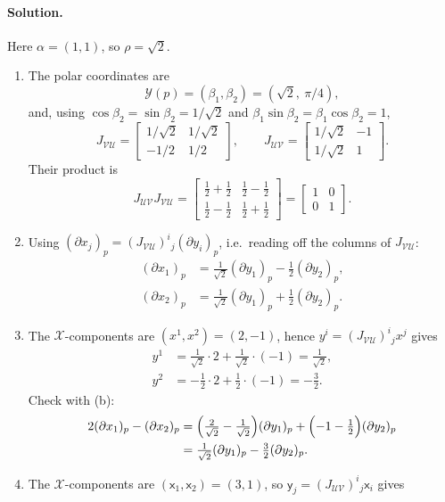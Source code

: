 \documentclass[11pt]{article}
\begin{document}
\paragraph{Solution.} Here $\alpha=(1,1)$, so $\rho=\sqrt2$.
\begin{enumerate}[label=(\alph*)]
\item The polar coordinates are
\[
\mathcal Y(p)=(\beta_1,\beta_2)=(\sqrt2,\ \pi/4),
\]
and, using $\cos\beta_2=\sin\beta_2=1/\sqrt2$ and $\beta_1\sin\beta_2=\beta_1\cos\beta_2=1$,
\[
J_{\mathcal{VU}}=\begin{bmatrix}1/\sqrt2&1/\sqrt2\\-1/2&1/2\end{bmatrix},\qquad
J_{\mathcal{UV}}=\begin{bmatrix}1/\sqrt2&-1\\1/\sqrt2&1\end{bmatrix}.
\]
Their product is
\[
J_{\mathcal{UV}}J_{\mathcal{VU}}=\begin{bmatrix}\tfrac12+\tfrac12&\tfrac12-\tfrac12\\ \tfrac12-\tfrac12&\tfrac12+\tfrac12\end{bmatrix}=\begin{bmatrix}1&0\\0&1\end{bmatrix}.
\]
\item Using $(\partial x_j)_p=(J_{\mathcal{VU}})^i{}_j(\partial y_i)_p$, i.e.\ reading off the columns of $J_{\mathcal{VU}}$:
\begin{align*}
(\partial x_1)_p&=\tfrac1{\sqrt2}(\partial y_1)_p-\tfrac12(\partial y_2)_p,\\
(\partial x_2)_p&=\tfrac1{\sqrt2}(\partial y_1)_p+\tfrac12(\partial y_2)_p.
\end{align*}
\item The $\mathcal X$-components are $(x^1,x^2)=(2,-1)$, hence $y^i=(J_{\mathcal{VU}})^i{}_jx^j$ gives
\begin{align*}
y^1&=\tfrac1{\sqrt2}\cdot2+\tfrac1{\sqrt2}\cdot(-1)=\tfrac1{\sqrt2},\\
y^2&=-\tfrac12\cdot2+\tfrac12\cdot(-1)=-\tfrac32.
\end{align*}
Check with (b):
\begin{align*}
2(\partial x_1)_p-(\partial x_2)_p&=\Bigl(\tfrac2{\sqrt2}-\tfrac1{\sqrt2}\Bigr)(\partial y_1)_p+\Bigl(-1-\tfrac12\Bigr)(\partial y_2)_p\\
&=\tfrac1{\sqrt2}(\partial y_1)_p-\tfrac32(\partial y_2)_p.
\end{align*}
\item The $\mathcal X$-components are $(\mathsf x_1,\mathsf x_2)=(3,1)$, so $\mathsf y_j=(J_{\mathcal{UV}})^i{}_j\mathsf x_i$ gives

\end{enumerate}
\end{document}
